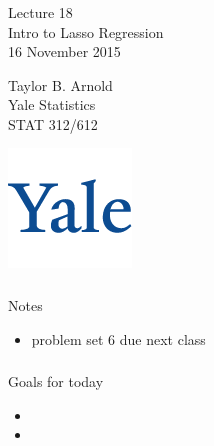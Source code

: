 



\begin{frame}[fragile] \frametitle{}

\vfill

{\fontsize{0.7cm}{0cm}\selectfont Lecture 18 \\\vspace{0.2cm}
Intro to Lasso Regression}\\\vspace{0.5cm}
16 November 2015

\vspace{2cm}

\begin{minipage}{0.6\textwidth}
Taylor B. Arnold \\
Yale Statistics \\
STAT 312/612
\end{minipage}
\hfill
\begin{minipage}{0.3\textwidth}\raggedleft
\includegraphics[scale=0.3]{../yale-logo.png}
\end{minipage}%

\end{frame}

\begin{frame}[fragile] \frametitle{}

{\color{yaleblue}\fontsize{16pt}{20pt}\selectfont Notes}

\begin{itemize}
\item problem set 6 due next class
\end{itemize}

\end{frame}

\begin{frame}[fragile] \frametitle{}

{\color{yaleblue}\fontsize{16pt}{20pt}\selectfont Goals for today}

\begin{itemize}
\item
\item
\end{itemize}

\end{frame}















